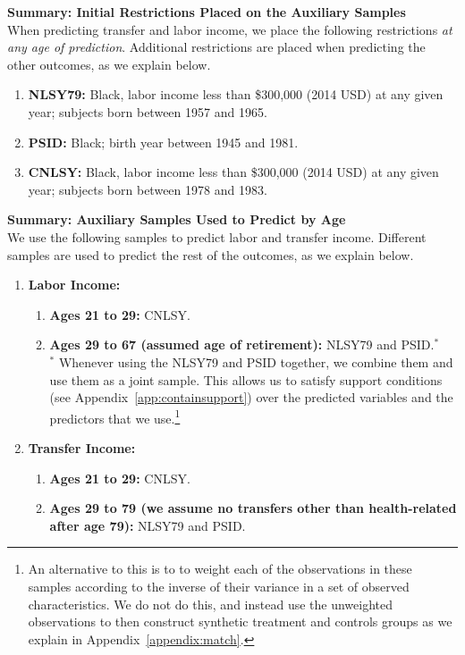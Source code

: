 \noindent \textbf{Summary: Initial Restrictions Placed on the Auxiliary Samples}\\
When predicting transfer and labor income, we place the following restrictions \textit{at any age of prediction}. Additional restrictions are placed when predicting the other outcomes, as we explain below.
\begin{enumerate}
\item \textbf{NLSY79:} Black, labor income less than \$300,000 (2014 USD) at any given year; subjects born between 1957 and 1965.
\item \textbf{PSID:} Black; birth year between 1945 and 1981.
\item \textbf{CNLSY:} Black, labor income less than \$300,000 (2014 USD) at any given year; subjects born between 1978 and 1983.
\end{enumerate}

\noindent \textbf{Summary: Auxiliary Samples Used to Predict by Age}\\
We use the following samples to predict labor and transfer income. Different samples are used to predict the rest of the outcomes, as we explain below.
\begin{enumerate}
\item \textbf{Labor Income:} 
\begin{enumerate}
\item \textbf{Ages 21 to 29:} CNLSY.
\item \textbf{Ages 29 to 67 (assumed age of retirement):} NLSY79 and PSID.$^{*}$\\ 
\noindent $^{*}$ Whenever using the NLSY79 and PSID together, we combine them and use them as a joint sample. This allows us to satisfy support conditions (see Appendix~\ref{app:containsupport}) over the predicted variables and the predictors that we use.\footnote{An alternative to this is to to weight each of the observations in these samples according to the inverse of their variance in a set of observed characteristics. We do not do this, and instead use the unweighted observations to then construct synthetic treatment and controls groups as we explain in Appendix~\ref{appendix:match}.}
\end{enumerate}
\item \textbf{Transfer Income:}
\begin{enumerate}
\item \textbf{Ages 21 to 29:} CNLSY.
\item \textbf{Ages 29 to 79 (we assume no transfers other than health-related after age 79):} NLSY79 and PSID.
\end{enumerate}
\end{enumerate}

